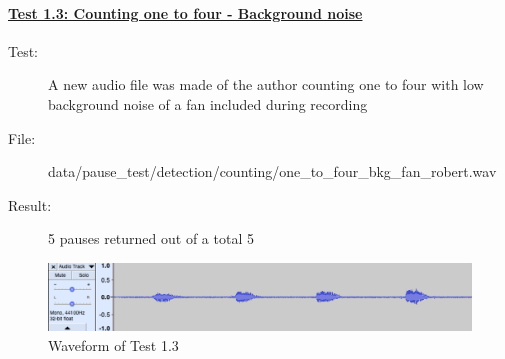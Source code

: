 


\paragraph{\underline{Test 1.3: Counting one to four - Background noise}}
\begin{description}
	\item[Test:] A new audio file was made of the author counting one to four 
				with low background noise of a fan included during recording 
	\item[File:] data/pause\_test/detection/counting/one\_to\_four\_bkg\_fan\_robert.wav
	\item[Result:] 5 pauses returned out of a total 5
\end{description}
\begin{figure}[h]
	\center
	\includegraphics[scale=0.2]{src/main-matter/results/preliminary-testing/detection/015}
	\caption{Waveform of Test 1.3}
	\label{fig:015}
\end{figure}

